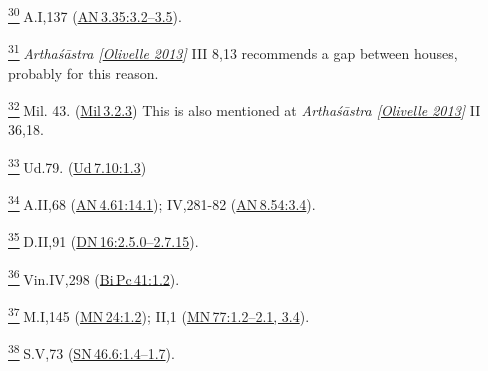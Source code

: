 \label{footprints_split_024.html_fn30}
\hyperref[footprints_split_006.htmlux5cux23fnref30]{\textsuperscript{30}} A.I,137
(\href{https://suttacentral.net/an3.35/en/sujato\#3.2}{AN\,3.35:3.2--3.5}).

\label{footprints_split_024.html_fn31}
\hyperref[footprints_split_006.htmlux5cux23fnref31]{\textsuperscript{31}} \emph{{Arthaśāstra
{{[}\hyperref[footprints_split_022.htmlux5cux23Olivelleux5cux25202013]{Olivelle
2013}{]}}}} III 8,13 recommends a gap between houses, probably for this
reason.

\label{footprints_split_024.html_fn32}
\hyperref[footprints_split_006.htmlux5cux23fnref32]{\textsuperscript{32}} Mil.
43. (\href{https://suttacentral.net/mil3.2.3}{Mil\,3.2.3}) This is also
mentioned at \emph{{Arthaśāstra
{{[}\hyperref[footprints_split_022.htmlux5cux23Olivelleux5cux25202013]{Olivelle
2013}{]}}}} II 36,18.

\label{footprints_split_024.html_fn33}
\hyperref[footprints_split_006.htmlux5cux23fnref33]{\textsuperscript{33}} Ud.79.
(\href{https://suttacentral.net/ud7.10/en/sujato\#1.3}{Ud\,7.10:1.3})

\label{footprints_split_024.html_fn34}
\hyperref[footprints_split_006.htmlux5cux23fnref34]{\textsuperscript{34}} A.II,68
(\href{https://suttacentral.net/an4.61/en/sujato\#14.1}{AN\,4.61:14.1});
IV,281-82
(\href{https://suttacentral.net/an8.54/en/sujato\#3.4}{AN\,8.54:3.4}).

\label{footprints_split_024.html_fn35}
\hyperref[footprints_split_006.htmlux5cux23fnref35]{\textsuperscript{35}} D.II,91
(\href{https://suttacentral.net/dn16/en/sujato\#2.5.0}{DN\,16:2.5.0--2.7.15}).

\label{footprints_split_024.html_fn36}
\hyperref[footprints_split_006.htmlux5cux23fnref36]{\textsuperscript{36}} Vin.IV,298
(\href{https://suttacentral.net/pli-tv-bi-vb-pc41/en/brahmali\#1.2}{Bi\,Pc\,41:1.2}).

\label{footprints_split_024.html_fn37}
\hyperref[footprints_split_006.htmlux5cux23fnref37]{\textsuperscript{37}} M.I,145
(\href{https://suttacentral.net/mn24/en/sujato\#1.2}{MN\,24:1.2}); II,1
(\href{https://suttacentral.net/mn77/en/sujato\#1.2}{MN\,77:1.2--2.1,
3.4}).

\label{footprints_split_024.html_fn38}
\hyperref[footprints_split_006.htmlux5cux23fnref38]{\textsuperscript{38}} S.V,73
(\href{https://suttacentral.net/sn46.6/en/sujato\#1.4}{SN\,46.6:1.4--1.7}).


